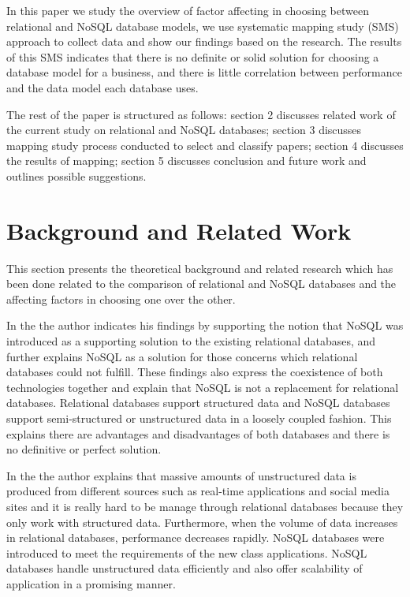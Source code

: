 \documentclass[sigconf,nonacm]{acmart}
\begin{document}
In this paper we study the overview of factor affecting in choosing between relational and NoSQL database models, we use systematic mapping study (SMS) approach to collect data and show our findings based on the research. The results of this SMS indicates that there is no definite or solid solution for choosing a database model for a business\cite{1}\cite{2}, and there is little correlation between performance and the data model each database uses\cite{4}.

The rest of the paper is structured as follows: section 2 discusses related work of the current study on relational and NoSQL databases; section 3 discusses mapping study process conducted to select and classify papers; section 4 discusses the results of mapping; section 5 discusses conclusion and future work and outlines possible suggestions.  

\section{Background and Related Work}
This section presents the theoretical background and related research which has been done related to the comparison of relational and NoSQL databases and the affecting factors in choosing one over the other.

In the \cite{1} the author indicates his findings by supporting the notion that NoSQL was introduced as a supporting solution to the existing relational databases, and further explains NoSQL as a solution for those concerns which relational databases could not fulfill. These findings also express the coexistence of both technologies together and explain that NoSQL is not a replacement for relational databases. Relational databases support structured data and NoSQL databases support semi-structured or unstructured data in a loosely coupled fashion. This explains there are advantages and disadvantages of both databases and there is no definitive or perfect solution.

In the \cite{2} the author explains that massive amounts of unstructured data is produced from different sources such as real-time applications and social media sites and it is really hard to be manage through relational databases because they only work with structured data. Furthermore, when the volume of data increases in relational databases, performance decreases rapidly. NoSQL databases were introduced to meet the requirements of the new class applications. NoSQL databases handle unstructured data efficiently and also offer scalability of application in a promising manner.
\end{document}
